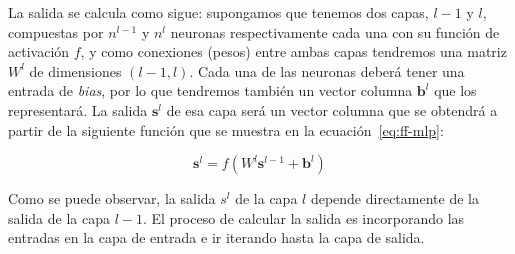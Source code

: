 La salida se calcula como sigue: supongamos que tenemos dos capas, $l-1$ y $l$, compuestas por $n^{l-1}$ y $n^l$ neuronas respectivamente cada una con su función de activación $f$, y como conexiones (pesos) entre ambas capas tendremos una matriz $W^l$ de dimensiones $(l-1, l)$. Cada una de las neuronas deberá tener una entrada de \textit{bias}, por lo que tendremos también un vector columna $\mathbf{b}^l$ que los representará. La salida $\mathbf{s}^l$ de esa capa será un vector columna que se obtendrá a partir de la siguiente función que se muestra en la ecuación~\ref{eq:ff-mlp}:

\begin{equation}
	\mathbf{s}^l = f(W^l \mathbf{s}^{l-1} + \mathbf{b}^l)
	\label{eq:ff-mlp}
\end{equation}

Como se puede observar, la salida $s^l$ de la capa $l$ depende directamente de la salida de la capa $l - 1$. El proceso de calcular la salida es incorporando las entradas en la capa de entrada e ir iterando hasta la capa de salida.

